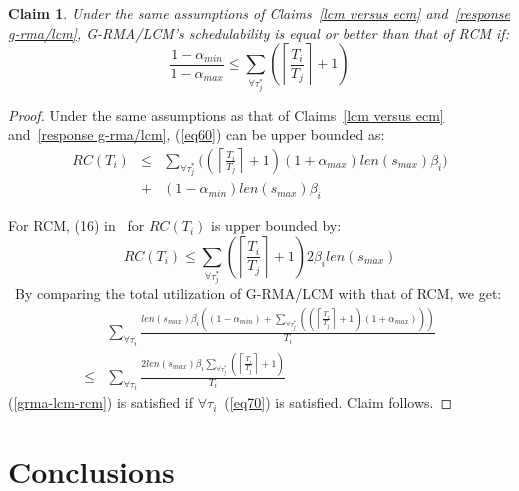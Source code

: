 \documentclass[conference]{IEEEtran}
\newtheorem{clm}{Claim}
\begin{document}
\begin{clm}
Under the same assumptions of Claims~\ref{lcm versus ecm} and~\ref{response g-rma/lcm}, G-RMA/LCM's schedulability is equal or better than that of RCM if:
\begin{equation}
\frac{1-\alpha_{min}}{1-\alpha_{max}}\le \sum_{\forall \tau_j^*}\left( \left\lceil\frac{T_i}{T_j}\right\rceil +1 \right)
\label{eq70}\end{equation}
\end{clm}
%
\begin{proof}
Under the same assumptions as that of Claims~\ref{lcm versus ecm} and~\ref{response g-rma/lcm}, (\ref{eq60}) can be upper bounded as:
\begin{eqnarray}
RC(T_i) & \le & \sum_{\forall \tau_{j}^{*}}\bigg(\left(\left\lceil\frac{T_{i}}{T_{j}}\right\rceil +1\right)(1+\alpha_{max})
 len(s_{max})\beta_{i}\bigg)\nonumber\\
 & + & (1-\alpha_{min})len(s_{max})\beta_{i}\label{eq68}\end{eqnarray}
 
For RCM, (16) in~\cite{stmconcurrencycontrol:emsoft11} for $RC(T_{i})$ is upper bounded by:
\begin{equation*}
RC(T_{i})\le\sum_{\forall \tau_{j}^{*}}\left(\left\lceil\frac{T_{i}}{T_{j}}\right\rceil +1\right)2\beta_{i}len(s_{max})\label{eq69}\end{equation*}\
By comparing the total utilization of G-RMA/LCM with that of RCM,
we get:
\begin{eqnarray}
 & \sum_{\forall\tau_{i}}\frac{len\left(s_{max}\right)\beta_{i}\left(\left(1-\alpha_{min}\right)+\sum_{\forall\tau_{j}^{*}}\left(\left(\left\lceil\frac{T_{i}}{T_{j}}\right\rceil+1\right)\left(1+\alpha_{max}\right)\right)\right)}{T_{i}}\nonumber\\
\le & \sum_{\forall\tau_{i}}\frac{2len\left(s_{max}\right)\beta_{i}\sum_{\forall\tau_{j}^{*}}\left(\left\lceil\frac{T_{i}}{T_{j}}\right\rceil+1\right)}{T_{i}}\label{grma-lcm-rcm}\end{eqnarray}
(\ref{grma-lcm-rcm}) is satisfied if $\forall \tau_i$~(\ref{eq70}) is satisfied. Claim follows.
\end{proof}

\section{Conclusions}
\label{sec:conclusions}
\end{document}
